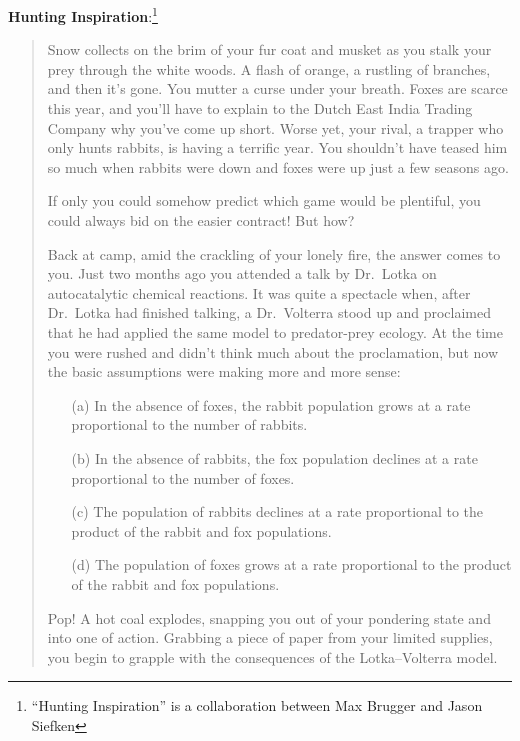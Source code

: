 \documentclass[letter]{article}
\newcommand{\setheader}[6]{
	\lhead{{\sc #1}\\{\sc #2} ({\small \it \today})}
	\rhead{
		{\bf #3} 
		\ifthenelse{\equal{#4}{}}{}{(#4)}\\
		{\bf #5} 
		\ifthenelse{\equal{#6}{}}{}{(#6)}%
	}
}
\begin{document}
	\setheader{Math 281-2}{Project 2}{Due Friday, February 19}{}{}{}

	{\bf Hunting Inspiration}:\footnote{``Hunting Inspiration'' is a collaboration between Max Brugger and Jason Siefken}
	\vspace{-.3cm}
	\begin{quote}
		Snow collects on the brim of your fur coat and musket 
		as you stalk your prey through the white woods.  A flash 
		of orange, a rustling of branches, and then it's
		gone.
		You mutter a curse under your breath.  Foxes are scarce this year, 
		and you'll have to explain to the Dutch East India Trading Company 
		why you've come up short.  Worse yet, your rival, a
		trapper who only hunts 
		rabbits, is having a terrific year.  You shouldn't have teased him so 
		much when rabbits were down and foxes were up just a few seasons ago.

		If only you could somehow predict which game would be plentiful, you
		could always bid on the easier contract!  But how?

		Back at camp, amid the crackling of your lonely fire, 
		the answer comes to you.  Just two months ago
		you attended a talk by Dr.~\!Lotka on autocatalytic 
		chemical reactions.  It was quite a spectacle when,
		after Dr.~\!Lotka had finished talking, a Dr.~\!Volterra stood up
		and proclaimed
		that he had applied the same model to predator-prey ecology.  At
		the time you were rushed and didn't think much about the proclamation, but now the
		basic assumptions were making more and more sense:

		\begin{enumerate}
			\item[(a)] In the absence of foxes, the rabbit population grows
				at a rate proportional to the number of rabbits.
			\item[(b)] In the absence of rabbits, the fox population declines
				at a rate proportional to the number of foxes.
			\item[(c)] The population of rabbits declines at a rate proportional
				to the product of the rabbit and fox populations.
			\item[(d)] The population of foxes grows at a rate proportional 
				to the product of the rabbit and fox populations.
		\end{enumerate}

		Pop! A hot coal explodes, snapping you out of your pondering state
		and into one of action.  Grabbing a piece of paper from your limited
		supplies, you begin to grapple with the consequences of the
		Lotka--Volterra model.
	\end{quote}
\end{document}
